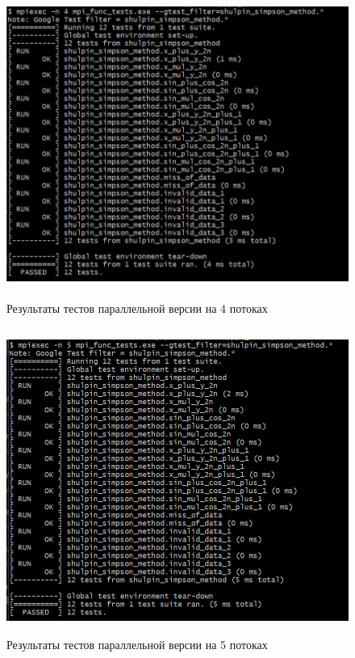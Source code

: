 \documentclass[12pt,a4paper]{article}
\begin{document}
\begin{figure}[H]
\centering
\includegraphics[height=10cm]{img/4nmpitest.jpg}
\caption{\label{fig:visualClass} Результаты тестов параллельной версии на 4 потоках}
\end{figure}

\begin{figure}[H]
\centering
\includegraphics[height=10cm]{img/5nmpitest.jpg}
\caption{\label{fig:visualClass} Результаты тестов параллельной версии на 5 потоках}
\end{figure}
\end{document}
